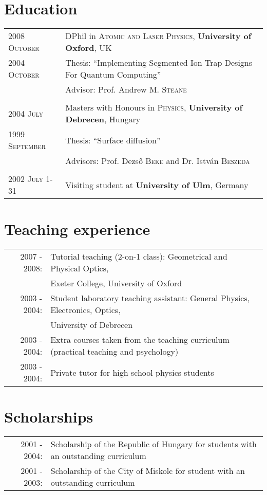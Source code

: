 \documentclass[10pt]{article}
\begin{document}
\section*{Education}
\begin{tabular}{p{3cm}|p{11cm}}	
 \textsc{2008 October}& DPhil in \textsc{Atomic and Laser Physics}, \textbf{University of Oxford}, UK\\
 \textsc{2004 October} & Thesis: ``Implementing Segmented Ion Trap Designs For Quantum Computing'' \\ & \small Advisor: Prof. Andrew M. \textsc{Steane}\\\multicolumn{2}{c}{} \\

\textsc{2004 July} & Masters with Honours in \textsc{Physics}, \textbf{University of Debrecen}, Hungary\\
\textsc{1999 September} & Thesis: ``Surface diffusion'' \\ & \small Advisors: Prof. Dezs\H{o} \textsc{Beke} and Dr. Istv\'an \textsc{Beszeda}\\\multicolumn{2}{c}{} \\

\textsc{2002 July 1-31}& Visiting student at \textbf{University of Ulm}, Germany
\end{tabular}

\section*{Teaching experience}
\begin{tabular}{rl}
\textsc{2007 - 2008:} & Tutorial teaching (2-on-1 class): Geometrical and Physical Optics,\\& Exeter College, University of Oxford \\
\textsc{2003 - 2004:} & Student laboratory teaching assistant: General Physics, Electronics, Optics,\\& University of Debrecen \\
\textsc{2003 - 2004:} & Extra courses taken from the teaching curriculum (practical teaching and psychology)\\
\textsc{2003 - 2004:} & Private tutor for high school physics students
\end{tabular}

\section*{Scholarships}
\begin{tabular}{rl}
\textsc{2001 - 2004:} & Scholarship of the Republic of Hungary for students with an outstanding curriculum\\
\textsc{2001 - 2003:} & Scholarship of the City of Miskolc for student with an outstanding curriculum
\end{tabular}
\end{document}

